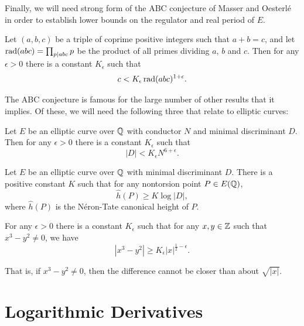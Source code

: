 \documentclass[10pt]{article}
\begin{document}
Finally, we will need strong form of the ABC conjecture of Masser and Oesterl\'{e} in order to establish lower bounds on the regulator and real period of $E$.
\begin{conjecture} \label{conj:ABC}
Let $(a,b,c)$ be a triple of coprime positive integers such that $a+b = c$, and let $\operatorname{rad}(abc) = \prod_{p | abc} p$ be the product of all primes dividing $a$, $b$ and $c$. Then for any $\epsilon > 0$ there is a constant $K_{\epsilon}$ such that
\begin{equation}
c < K_{\epsilon}\operatorname{rad}(abc)^{1+\epsilon}.
\end{equation}
\end{conjecture}
The ABC conjecture is famous for the large number of other results that it implies. Of these, we will need the following three that relate to elliptic curves:

\begin{conjecture}[Szpiro]\label{conj:Szpiro}
Let $E$ be an elliptic curve over $\mathbb{Q}$ with conductor $N$ and minimal discriminant $D$. Then for any $\epsilon > 0$ there is a constant $K_{\epsilon}$ such that
\begin{equation}
|D| < K_{\epsilon}N^{6+\epsilon}.
\end{equation}
\end{conjecture}

\begin{conjecture}[Lang]\label{conj:Lang}
Let $E$ be an elliptic curve over $\mathbb{Q}$ with minimal discriminant $D$. There is a positive constant $K$ such that for any nontorsion point $P\in E(\mathbb{Q})$,
\begin{equation}
\hat{h}(P) \ge K\log |D|,
\end{equation}
where $\hat{h}(P)$ is the N\'{e}ron-Tate canonical height of $P$.
\end{conjecture}

\begin{conjecture}[Hall]\label{conj:Hall}
For any $\epsilon > 0$ there is a constant $K_{\epsilon}$ such that for any $x,y \in \mathbb{Z}$ such that $x^3-y^2 \ne 0$, we have
\begin{equation}
|x^3-y^2| \ge K_{\epsilon} |x|^{\frac{1}{2}-\epsilon}.
\end{equation}
\end{conjecture}
That is, if $x^3-y^2 \ne 0$, then the difference cannot be closer than about $\sqrt{|x|}$.


\newpage
\section{Logarithmic Derivatives}\label{sec:log_derivs}
\end{document}

